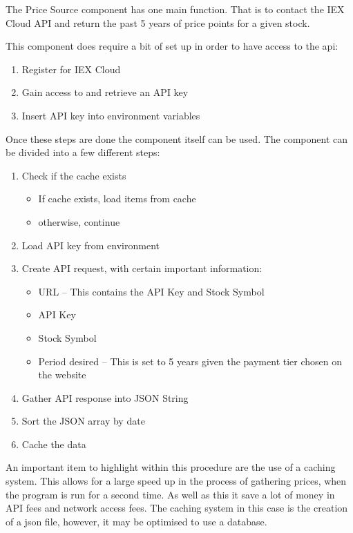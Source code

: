 The Price Source component has one main function. That is to contact the IEX Cloud API and return the past 5 years of price points for a given stock.

This component does require a bit of set up in order to have access to the api:
\begin{enumerate}
    \item Register for IEX Cloud
    \item Gain access to and retrieve an API key
    \item Insert API key into environment variables
\end{enumerate}

Once these steps are done the component itself can be used. The component can be divided into a few different steps:
\begin{enumerate}
    \item Check if the cache exists
    \begin{itemize}
        \item If cache exists, load items from cache
        \item otherwise, continue
    \end{itemize}
    \item Load API key from environment
    \item Create API request, with certain important information:
    \begin{itemize}
        \item URL -- This contains the API Key and Stock Symbol
        \item API Key
        \item Stock Symbol
        \item Period desired -- This is set to 5 years given the payment tier chosen on the website
    \end{itemize}
    \item Gather API response into JSON String
    \item Sort the JSON array by date
    \item Cache the data
\end{enumerate}

An important item to highlight within this procedure are the use of a caching system. This allows for a large speed up in the process of gathering prices, when the program is run for a second time. As well as this it save a lot of money in API fees and network access fees. The caching system in this case is the creation of a json file, however, it may be optimised to use a database.

